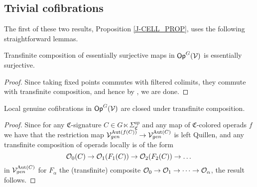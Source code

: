 \documentclass[a4paper,10pt
,draft
]{article}%
\renewcommand{\1}{\eta}%
\newcommand{\SC}{\Sigma_{\mathfrak C}}
\begin{document}
\newpage






\subsection{Trivial cofibrations}


The first of these two results, Proposition \ref{J-CELL_PROP}, uses the following straightforward lemmas.

\begin{lemma}
      \label{TRANSCOMP_ES_LEM}
      Transfinite composition of essentially surjective maps in $\mathsf{Op}^G(\mathcal V)$ is essentially surjective.
\end{lemma}
\begin{proof}
      Since taking fixed points commutes with filtered colimits, they commute with transfinite composition,
      and hence by \cite[4.17]{Cav}, we are done.
\end{proof}

\begin{lemma}
      \label{TRANSCOMP_LGC_LEM}
      Local genuine cofibrations in $\mathsf{Op}^G(\mathcal V)$ are closed under transfinite composition.
\end{lemma}

\begin{proof}
      Since for any $\mathfrak C$-signature $C \in G \ltimes \SC^{op}$ and any map of $\mathfrak C$-colored operads $f$ we have that
      the restriction map
      $\mathcal V^{\operatorname{Aut}(f(C))}_{gen} \to \mathcal V^{\operatorname{Aut}(C)}_{gen}$
      is left Quillen,
      and any transfinite composition of operads locally is of the form
      \begin{equation}
            \mathcal{O}_0(C) \to \mathcal{O}_1(F_1(C)) \to \mathcal{O}_2(F_2(C)) \to \dots   
      \end{equation}
      in $\mathcal V^{\operatorname{Aut}(C)}_{gen}$
      for $F_\alpha$ the (transfinite) composite $\mathcal{O}_0 \to \mathcal{O}_1 \to \dots \to \mathcal{O}_\alpha$,
      the result follows.
\end{proof}
\end{document}
